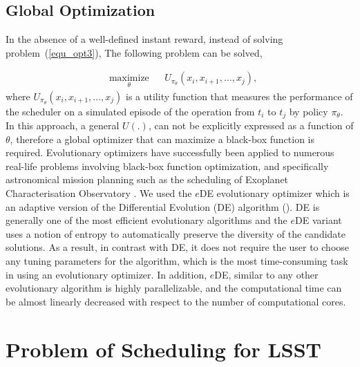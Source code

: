 \documentclass[12pt]{aastex62}
\theoremstyle{definition}
\begin{document}
\subsection{Global Optimization}\label{sec_gopt}
In the absence of a well-defined instant reward, instead of solving problem~(\ref{equ_opt3}), The following problem can be solved,

\begin{equation}%
\begin{aligned}
& \underset{\theta}{\text{maximize}}
& & U_{\pi_{\theta}}(x_i,x_{i+1}, \dots, x_{j}),
\end{aligned}
\end{equation}
where $U_{\pi_{\theta}}(x_i,x_{i+1}, \dots, x_{j})$ is a utility function that measures the performance of the scheduler on a simulated episode of the operation from $t_i$ to $t_j$ by policy $\pi_{\theta}$. In this approach, a general $U(.)$, can not be explicitly expressed as a function of $\theta$, therefore a global optimizer that can maximize a black-box function is required. Evolutionary optimizers have successfully been applied to numerous real-life problems involving black-box function optimization, and specifically astronomical mission planning such as the scheduling of Exoplanet Characterisation Observatory \citep{garcia2015artificial}. We used the $e$DE evolutionary optimizer \citep{naghib2016entropic} which is an adaptive version of the Differential Evolution (DE) algorithm (\citep{storn1997differential}). DE is generally one of the most efficient evolutionary algorithms and the $e$DE variant uses a notion of entropy to automatically preserve the diversity of the candidate solutions. As a result, in contrast with DE, it does not require the user to choose any tuning parameters for the algorithm, which is the most time-consuming task in using an evolutionary optimizer. In addition, $e$DE, similar to any other evolutionary algorithm is highly parallelizable, and the computational time can be almost linearly decreased with respect to the number of computational cores.

\section{Problem of Scheduling for LSST}\label{sec_lsst_problem}
\end{document}
